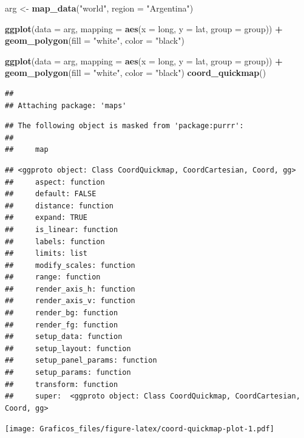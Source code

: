 \documentclass[]{book}
\newenvironment{Shaded}{\begin{snugshade}}{\end{snugshade}}
\newcommand{\DataTypeTok}[1]{\textcolor[rgb]{0.13,0.29,0.53}{#1}}
\newcommand{\KeywordTok}[1]{\textcolor[rgb]{0.13,0.29,0.53}{\textbf{#1}}}
\newcommand{\NormalTok}[1]{#1}
\newcommand{\OperatorTok}[1]{\textcolor[rgb]{0.81,0.36,0.00}{\textbf{#1}}}
\newcommand{\StringTok}[1]{\textcolor[rgb]{0.31,0.60,0.02}{#1}}
\theoremstyle{definition}
\theoremstyle{definition}
\theoremstyle{definition}
\theoremstyle{remark}
\begin{document}
\begin{Shaded}
\begin{Highlighting}[]
\NormalTok{arg <-}\StringTok{ }\KeywordTok{map_data}\NormalTok{(}\StringTok{"world"}\NormalTok{, }\DataTypeTok{region =} \StringTok{"Argentina"}\NormalTok{)}

\KeywordTok{ggplot}\NormalTok{(}\DataTypeTok{data =}\NormalTok{ arg, }\DataTypeTok{mapping =} \KeywordTok{aes}\NormalTok{(}\DataTypeTok{x =}\NormalTok{ long, }\DataTypeTok{y =}\NormalTok{ lat, }\DataTypeTok{group =}\NormalTok{ group)) }\OperatorTok{+}
\StringTok{  }\KeywordTok{geom_polygon}\NormalTok{(}\DataTypeTok{fill =} \StringTok{"white"}\NormalTok{, }\DataTypeTok{color =} \StringTok{"black"}\NormalTok{)}

\KeywordTok{ggplot}\NormalTok{(}\DataTypeTok{data =}\NormalTok{ arg, }\DataTypeTok{mapping =} \KeywordTok{aes}\NormalTok{(}\DataTypeTok{x =}\NormalTok{ long, }\DataTypeTok{y =}\NormalTok{ lat, }\DataTypeTok{group =}\NormalTok{ group)) }\OperatorTok{+}
\StringTok{  }\KeywordTok{geom_polygon}\NormalTok{(}\DataTypeTok{fill =} \StringTok{"white"}\NormalTok{, }\DataTypeTok{color =} \StringTok{"black"}\NormalTok{)}
  \KeywordTok{coord_quickmap}\NormalTok{()}
\end{Highlighting}
\end{Shaded}

\begin{verbatim}
## 
## Attaching package: 'maps'
\end{verbatim}

\begin{verbatim}
## The following object is masked from 'package:purrr':
## 
##     map
\end{verbatim}

\begin{verbatim}
## <ggproto object: Class CoordQuickmap, CoordCartesian, Coord, gg>
##     aspect: function
##     default: FALSE
##     distance: function
##     expand: TRUE
##     is_linear: function
##     labels: function
##     limits: list
##     modify_scales: function
##     range: function
##     render_axis_h: function
##     render_axis_v: function
##     render_bg: function
##     render_fg: function
##     setup_data: function
##     setup_layout: function
##     setup_panel_params: function
##     setup_params: function
##     transform: function
##     super:  <ggproto object: Class CoordQuickmap, CoordCartesian, Coord, gg>
\end{verbatim}

\texttt{[image: Graficos\_files/figure-latex/coord-quickmap-plot-1.pdf]}
\end{document}
